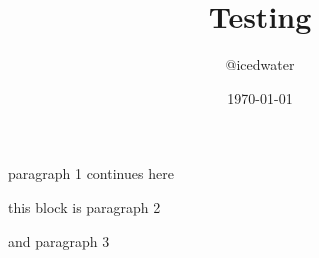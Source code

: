 \documentclass[20pt]{article}
\title{Testing}
\author{@icedwater}
\date{\today}
\begin{document}
\maketitle

\par{paragraph 1
continues here}

\par{this block is paragraph 2}

\par{and paragraph 3}
\end{document}
